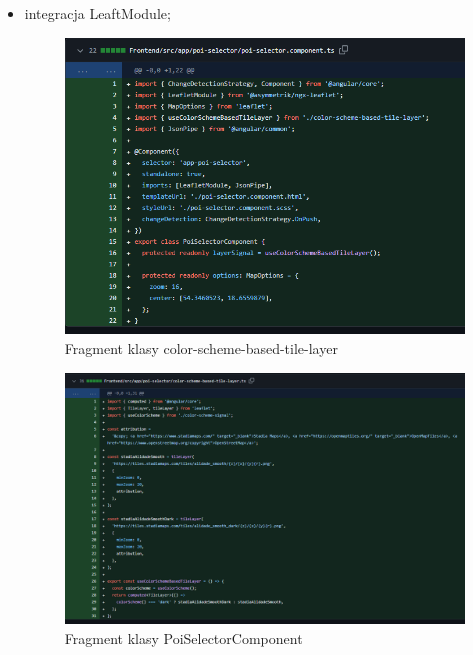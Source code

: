 \begin{itemize}
        \item integracja LeaftModule;
        \begin{figure}[H]
            \centering
            \includegraphics[width=1\textwidth]{attachments/leaflet1}
            \caption{Fragment klasy color-scheme-based-tile-layer}
            \label{fig:figure}
            \end{figure}
            \begin{figure}[H]
                \centering
                \includegraphics[width=1\textwidth]{attachments/leaflet2}
                \caption{Fragment klasy PoiSelectorComponent}
                \label{fig:figure}
                \end{figure}
    \end{itemize}

